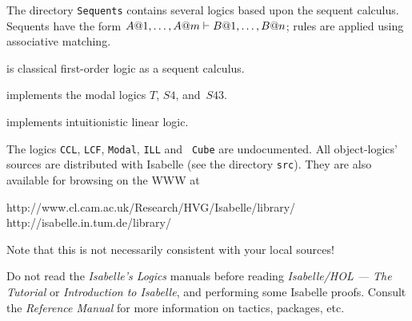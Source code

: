 The directory \texttt{Sequents} contains several logics based
  upon the sequent calculus.  Sequents have the form $A@1,\ldots,A@m\vdash
B@1,\ldots,B@n$; rules are applied using associative matching.
\begin{ttdescription}
\item[\thydx{LK}] is classical first-order logic as a sequent calculus.

\item[\thydx{Modal}] implements the modal logics $T$, $S4$, and~$S43$.  

\item[\thydx{ILL}] implements intuitionistic linear logic.
\end{ttdescription}

The logics \texttt{CCL}, \texttt{LCF}, \texttt{Modal}, \texttt{ILL} and {\tt
  Cube} are undocumented.  All object-logics' sources are distributed with
Isabelle (see the directory \texttt{src}).  They are also available for
browsing on the WWW at
\begin{ttbox}
http://www.cl.cam.ac.uk/Research/HVG/Isabelle/library/
http://isabelle.in.tum.de/library/
\end{ttbox}
Note that this is not necessarily consistent with your local sources!

\medskip Do not read the \emph{Isabelle's Logics} manuals before reading
\emph{Isabelle/HOL --- The Tutorial} or \emph{Introduction to Isabelle}, and
performing some Isabelle proofs.  Consult the {\em Reference Manual} for more
information on tactics, packages, etc.


